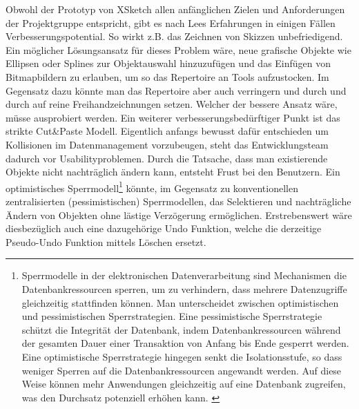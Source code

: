 \medskip Obwohl der Prototyp von XSketch allen anfänglichen Zielen und Anforderungen der Projektgruppe entspricht, gibt es nach Lees Erfahrungen in einigen Fällen Verbesserungspotential. So wirkt z.B. das Zeichnen von Skizzen unbefriedigend. Ein möglicher Lösungsansatz für dieses Problem wäre, neue grafische Objekte wie Ellipsen oder Splines zur Objektauswahl hinzuzufügen und das Einfügen von Bitmapbildern zu erlauben, um so das Repertoire an Tools aufzustocken.  Im Gegensatz dazu könnte man das Repertoire aber auch verringern und durch und durch auf reine Freihandzeichnungen setzen. Welcher der bessere Ansatz wäre, müsse ausprobiert werden.
Ein weiterer verbesserungsbedürftiger Punkt ist das strikte Cut\&Paste Modell. Eigentlich anfangs bewusst dafür entschieden um Kollisionen im Datenmanagement vorzubeugen, steht das Entwicklungsteam dadurch vor Usabilityproblemen. Durch die Tatsache, dass man existierende Objekte nicht nachträglich ändern kann, entsteht Frust bei den Benutzern. Ein optimistisches Sperrmodell\footnote{Sperrmodelle in der elektronischen Datenverarbeitung sind Mechanismen die Datenbankressourcen sperren, um zu verhindern, dass mehrere Datenzugriffe gleichzeitig stattfinden können. Man unterscheidet zwischen optimistischen und pessimistischen Sperrstrategien. Eine pessimistische Sperrstrategie schützt die Integrität der Datenbank, indem Datenbankressourcen während der gesamten Dauer einer Transaktion von Anfang bis Ende gesperrt werden. Eine optimistische Sperrstrategie hingegen senkt die Isolationsstufe, so dass weniger Sperren auf die Datenbankressourcen angewandt werden. Auf diese Weise können mehr Anwendungen gleichzeitig auf eine Datenbank zugreifen, was den Durchsatz potenziell erhöhen kann. \citep{IBM:1996:Online}} könnte, im Gegensatz zu konventionellen zentralisierten (pessimistischen) Sperrmodellen, das Selektieren und nachträgliche Ändern von Objekten ohne lästige Verzögerung ermöglichen. Erstrebenswert wäre diesbezüglich auch eine dazugehörige Undo Funktion, welche die derzeitige Pseudo-Undo Funktion mittels Löschen ersetzt.
